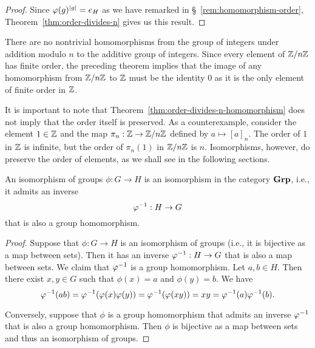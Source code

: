 \begin{proof}
    Since \(\varphi(g)^{\lvert g \rvert} = e_H\) as we have remarked in
    \S~\ref{rem:homomorphism-order}, Theorem~\ref{thm:order-divides-n} gives us
    this result.
\end{proof}

\begin{example}
    There are no nontrivial homomorphisms from the group of integers under
    addition modulo \(n\) to the additive group of integers. Since every element
    of \(\mathbb{Z}/n\mathbb{Z}\) has finite order, the preceding theorem implies that the image
    of any homomorphism from \(\mathbb{Z}/n\mathbb{Z}\) to \(\mathbb{Z}\) must be the identity \(0\) as
    it is the only element of finite order in \(\mathbb{Z}\).
\end{example}

\begin{example}
    It is important to note that Theorem~\ref{thm:order-divides-n-homomorphism}
    does not imply that the order itself is preserved. As a counterexample,
    consider the element \(1 \in \mathbb{Z}\) and the map \(\pi_n : \mathbb{Z} \to \mathbb{Z}/n\mathbb{Z}\)
    defined by \(a \mapsto [a]_n\). The order of \(1\) in \(\mathbb{Z}\) is infinite,
    but the order of \(\pi_n(1)\) in \(\mathbb{Z}/n\mathbb{Z}\) is \(n\). Isomorphisms, however,
    do preserve the order of elements, as we shall see in the following
    sections.
\end{example}

\begin{theorem}
    An isomorphism of groups \(\phi: G \to H\) is an isomorphism in the category
    \(\mathbf{Grp}\), i.e., it admits an inverse
    \[
        \varphi^{-1} : H \to G
    \]
    that is also a group homomorphism.
\end{theorem}

\begin{proof}
    Suppose that \(\phi: G \to H\) is an isomorphism of groups (i.e., it is
    bijective as a map between sets). Then it has an inverse \(\varphi^{-1} : H \to
    G\) that is also a map between sets. We claim that \(\varphi^{-1}\) is a group
    homomorphism. Let \(a, b \in H\). Then there exist \(x, y \in G\) such that
    \(\phi(x) = a\) and \(\phi(y) = b\). We have
    \[
        \varphi^{-1}(ab) = \varphi^{-1}(\varphi(x)\varphi(y)) = \varphi^{-1}(\varphi(xy)) = xy = \varphi^{-1}(a)\varphi^{-1}(b).
    \]
    
    Conversely, suppose that \(\phi\) is a group homomorphism that admits an
    inverse \(\varphi^{-1}\) that is also a group homomorphism. Then \(\phi\) is
    bijective as a map between sets and thus an isomorphism of groups.
\end{proof}


